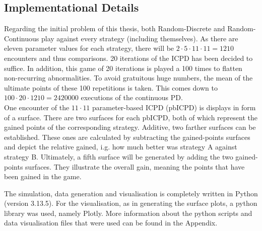 \documentclass[11pt]{article}
\begin{document}
\subsection{Implementational Details}

Regarding the initial problem of this thesis, both Random-Discrete and Random-Continuous play against every strategy (including themselves).
As there are eleven parameter values for each strategy, there will be $2 \cdot 5 \cdot 11 \cdot 11 = 1210$ encounters and thus comparisons.
20 iterations of the ICPD has been decided to suffice.
In addition, this game of 20 iterations is played a 100 times to flatten non-recurring abnormalities.
To avoid gratuitous huge numbers, the mean of the ultimate points of these 100 repetitions is taken.
This comes down to $100 \cdot 20 \cdot 1210 = 2420000$ executions of the continuous PD.\\

One encounter of the $11 \cdot 11$ parameter-based ICPD (pbICPD) is displays in form of a surface.
There are two surfaces for each pbICPD, both of which represent the gained points of the corresponding strategy.
Additive, two farther surfaces can be established.
These ones are calculated by subtracting the gained-points surfaces and depict the relative gained, i.g. how much better was strategy A against strategy B.
Ultimately, a fifth surface will be generated by adding the two gained-points surfaces.
They illustrate the overall gain, meaning the points that have been gained in the game.


The simulation, data generation and visualisation is completely written in Python (version 3.13.5).
For the visualisation, as in generating the surface plots, a python library was used, namely Plotly.
More information about the python scripts and data visualisation files that were used can be found in the Appendix.

	
\end{document}
